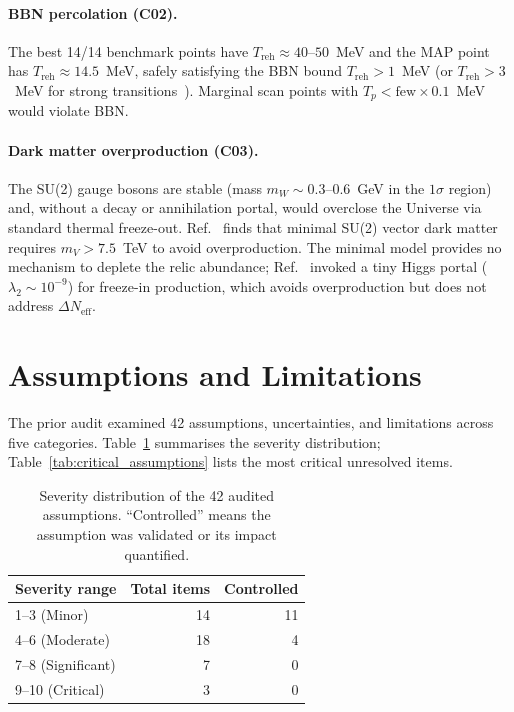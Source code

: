 \documentclass[12pt,a4paper]{article}
\begin{document}
\paragraph{BBN percolation (C02).} The best 14/14 benchmark points have $T_{\text{reh}} \approx 40$--$50$~MeV and the MAP point has $T_{\text{reh}} \approx 14.5$~MeV, safely satisfying the BBN bound $T_{\text{reh}} > 1$~MeV (or $T_{\text{reh}} > 3$~MeV for strong transitions~\cite{Bai:2022}). Marginal scan points with $T_p < \text{few}\times 0.1$~MeV would violate BBN.

\paragraph{Dark matter overproduction (C03).} The SU(2) gauge bosons are stable (mass $m_W \sim 0.3$--$0.6$~GeV in the $1\sigma$ region) and, without a decay or annihilation portal, would overclose the Universe via standard thermal freeze-out. Ref.~\cite{Frandsen:2023} finds that minimal SU(2) vector dark matter requires $m_V > 7.5$~TeV to avoid overproduction. The minimal model provides no mechanism to deplete the relic abundance; Ref.~\cite{Borah:2021} invoked a tiny Higgs portal ($\lambda_2 \sim 10^{-9}$) for freeze-in production, which avoids overproduction but does not address $\Delta N_{\text{eff}}$.

\section{Assumptions and Limitations}
\label{sec:assumptions}

The prior audit examined 42 assumptions, uncertainties, and limitations across five categories. Table~\ref{tab:audit_summary} summarises the severity distribution; Table~\ref{tab:critical_assumptions} lists the most critical unresolved items.

\begin{table}[h]
\centering
\begin{tabular}{lrr}
\toprule
Severity range & Total items & Controlled \\
\midrule
1--3 (Minor) & 14 & 11 \\
4--6 (Moderate) & 18 & 4 \\
7--8 (Significant) & 7 & 0 \\
9--10 (Critical) & 3 & 0 \\
\bottomrule
\end{tabular}
\caption{Severity distribution of the 42 audited assumptions. ``Controlled'' means the assumption was validated or its impact quantified.}
\label{tab:audit_summary}
\end{table}
\end{document}
